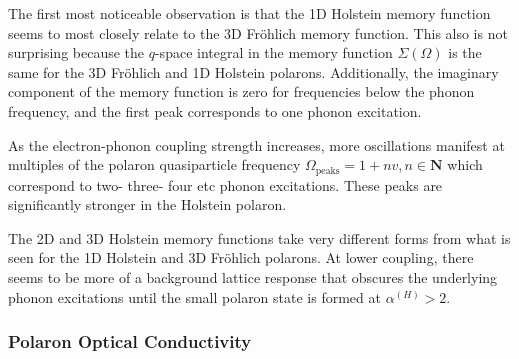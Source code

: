 The first most noticeable observation is that the 1D Holstein memory function seems to most closely relate to the 3D Fr\"ohlich memory function. This also is not surprising because the $q$-space integral in the memory function $\Sigma(\Omega)$ is the same for the 3D Fr\"ohlich and 1D Holstein polarons. Additionally, the imaginary component of the memory function is zero for frequencies below the phonon frequency, and the first peak corresponds to one phonon excitation.

As the electron-phonon coupling strength increases, more oscillations manifest at multiples of the polaron quasiparticle frequency $\Omega_{\text{peaks}} = 1 + n v, n \in \mathbf{N}$ which correspond to two- three- four etc phonon excitations. These peaks are significantly stronger in the Holstein polaron. 

The 2D and 3D Holstein memory functions take very different forms from what is seen for the 1D Holstein and 3D Fr\"ohlich polarons. At lower coupling, there seems to be more of a background lattice response that obscures the underlying phonon excitations until the small polaron state is formed at $\alpha^{(H)} > 2$.

\subsubsection{Polaron Optical Conductivity}

